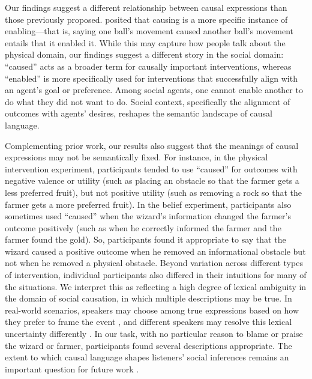 \documentclass[10pt,letterpaper]{article}
\begin{document}
Our findings suggest a different relationship between causal expressions than those previously proposed. 
\citet{beller2025language} posited that causing is a more specific instance of enabling---that is, saying one ball's movement caused another ball's movement entails that it enabled it. 
While this may capture how people talk about the physical domain, our findings suggest a different story in the social domain: ``caused'' acts as a broader term for causally important interventions, whereas ``enabled'' is more specifically used for interventions that successfully align with an agent's goal or preference.
Among social agents, one cannot enable another to do what they did not want to do.
Social context, specifically the alignment of outcomes with agents' desires, reshapes the semantic landscape of causal language.

Complementing prior work, our results also suggest that the meanings of causal expressions may not be semantically fixed. 
For instance, in the physical intervention experiment, participants tended to use ``caused'' for outcomes with negative valence or utility (such as placing an obstacle so that the farmer gets a less preferred fruit), but not positive utility (such as removing a rock so that the farmer gets a more preferred fruit).
In the belief experiment, participants also sometimes used ``caused'' when the wizard's information changed the farmer's outcome positively (such as when he correctly informed the farmer and the farmer found the gold).
So, participants found it appropriate to say that the wizard caused a positive outcome when he removed an informational obstacle but not when he removed a physical obstacle.
Beyond variation across different types of intervention, individual participants also differed in their intuitions for many of the situations. 
We interpret this as reflecting a high degree of lexical ambiguity in the domain of social causation, in which multiple descriptions may be true. 
In real-world scenarios, speakers may choose among true expressions based on how they prefer to frame the event \citep[e.g., exaggerate or minimize it, emphasize an agent's competence, or downplay an agent's role in influencing an outcome; see][]{rogers2017artful, macuch2024strategic}, and different speakers may resolve this lexical uncertainty differently \citep{bergen_pragmatic_2016}. 
In our task, with no particular reason to blame or praise the wizard or farmer, participants found several descriptions appropriate.
The extent to which causal language shapes listeners' social inferences remains an important question for future work \citep[see][]{kirfel2022inference,davis2025inference}.
\end{document}
